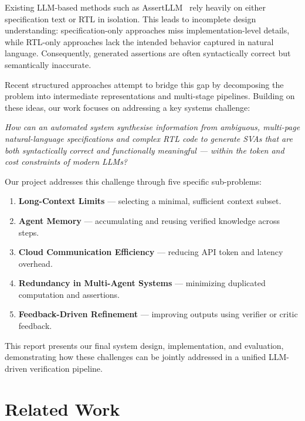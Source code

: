 \documentclass[12pt,a4paper]{article}
\begin{document}
Existing LLM-based methods such as AssertLLM~\cite{assertllm} rely heavily on
either specification text or RTL in isolation. This leads to incomplete design
understanding: specification-only approaches miss implementation-level details,
while RTL-only approaches lack the intended behavior captured in natural
language. Consequently, generated assertions are often syntactically correct
but semantically inaccurate.

Recent structured approaches attempt to bridge this gap by decomposing the
problem into intermediate representations and multi-stage pipelines. Building
on these ideas, our work focuses on addressing a key systems challenge:

\begin{center}
\textit{How can an automated system synthesise information from ambiguous,
multi-page natural-language specifications and complex RTL code to generate
SVAs that are both syntactically correct and functionally meaningful — within
the token and cost constraints of modern LLMs?}
\end{center}

Our project addresses this challenge through five specific sub-problems:

\begin{enumerate}[leftmargin=*, label=\textbf{P\arabic*.}]
  \item \textbf{Long-Context Limits} --- selecting a minimal, sufficient context subset.
  \item \textbf{Agent Memory} --- accumulating and reusing verified knowledge across steps.
  \item \textbf{Cloud Communication Efficiency} --- reducing API token and latency overhead.
  \item \textbf{Redundancy in Multi-Agent Systems} --- minimizing duplicated computation and assertions.
  \item \textbf{Feedback-Driven Refinement} --- improving outputs using verifier or critic feedback.
\end{enumerate}

\noindent
This report presents our final system design, implementation, and evaluation,
demonstrating how these challenges can be jointly addressed in a unified
LLM-driven verification pipeline.
\section{Related Work}
\end{document}
